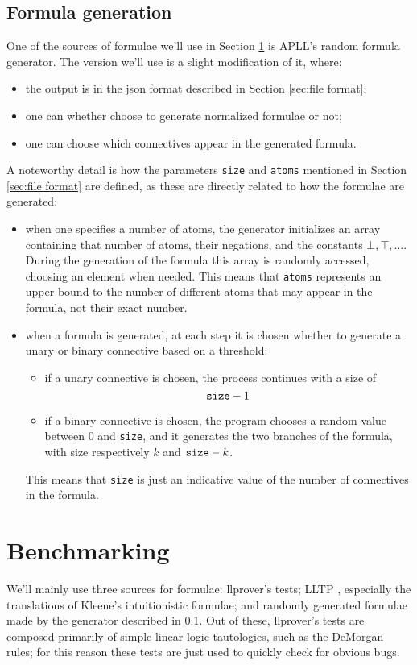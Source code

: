\subsection{Formula generation}\label{sec:formula generator}
One of the sources of formulae we'll use in Section \ref{sec:benchmarking} is APLL's random formula generator.
The version we'll use is a slight modification of it, where:
\begin{itemize}
	\item the output is in the json format described in Section \ref{sec:file format};
	\item one can whether choose to generate normalized formulae or not;
	\item one can choose which connectives appear in the generated formula.
\end{itemize}
A noteworthy detail is how the parameters \texttt{size} and \texttt{atoms} mentioned in Section \ref{sec:file format} are defined, as these are directly related to how the formulae are generated:
\begin{itemize}
	\item when one specifies a number of atoms, the generator initializes an array containing that number of atoms, their negations, and the constants $\bot, \top, \dots$.
		During the generation of the formula this array is randomly accessed, choosing an element when needed.
		This means that \texttt{atoms} represents an upper bound to the number of different atoms that may appear in the formula, not their exact number.
	\item when a formula is generated, at each step it is chosen whether to generate a unary or binary connective based on a threshold:
		\begin{itemize}
			\item if a unary connective is chosen, the process continues with a size of 
				$$\text{\texttt{size}} - 1$$
			\item if a binary connective is chosen, the program chooses a random value between 0 and \texttt{size}, and it generates the two branches of the formula, with size respectively $k$ and $\text{\texttt{size}} - k$.
		\end{itemize}
		This means that \texttt{size} is just an indicative value of the number of connectives in the formula.
\end{itemize}

\section{Benchmarking}\label{sec:benchmarking}
We'll mainly use three sources for formulae: llprover's tests; LLTP \cite{LLTP}, especially the translations of Kleene's intuitionistic formulae; and randomly generated formulae made by the generator described in \ref{sec:formula generator}.
Out of these, llprover's tests are composed primarily of simple linear logic tautologies, such as the DeMorgan rules; for this reason these tests are just used to quickly check for obvious bugs.

